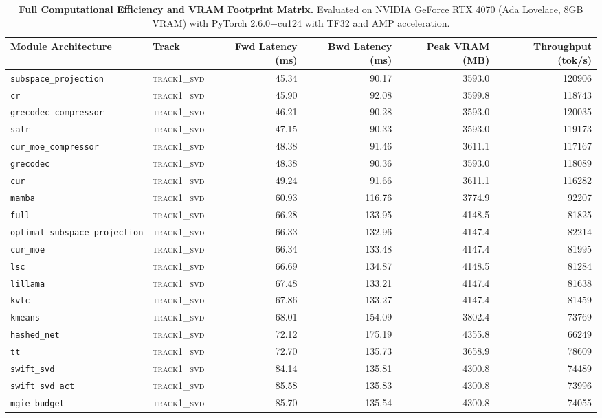\begin{table}[t]
\centering
\small
\caption{\textbf{Full Computational Efficiency and VRAM Footprint Matrix.} Evaluated on NVIDIA GeForce RTX 4070 (Ada Lovelace, 8GB VRAM) with PyTorch 2.6.0+cu124 with TF32 and AMP acceleration.}
\label{tab:efficiency_benchmark_results}
\begin{tabular}{l l r r r r}
\toprule
\textbf{Module Architecture} & \textbf{Track} & \textbf{Fwd Latency (ms)} & \textbf{Bwd Latency (ms)} & \textbf{Peak VRAM (MB)} & \textbf{Throughput (tok/s)} \\
\midrule
\texttt{subspace\_projection} & \textsc{track1\_svd} & 45.34 & 90.17 & 3593.0 & 120906 \\
\texttt{cr} & \textsc{track1\_svd} & 45.90 & 92.08 & 3599.8 & 118743 \\
\texttt{grecodec\_compressor} & \textsc{track1\_svd} & 46.21 & 90.28 & 3593.0 & 120035 \\
\texttt{salr} & \textsc{track1\_svd} & 47.15 & 90.33 & 3593.0 & 119173 \\
\texttt{cur\_moe\_compressor} & \textsc{track1\_svd} & 48.38 & 91.46 & 3611.1 & 117167 \\
\texttt{grecodec} & \textsc{track1\_svd} & 48.38 & 90.36 & 3593.0 & 118089 \\
\texttt{cur} & \textsc{track1\_svd} & 49.24 & 91.66 & 3611.1 & 116282 \\
\texttt{mamba} & \textsc{track1\_svd} & 60.93 & 116.76 & 3774.9 & 92207 \\
\texttt{full} & \textsc{track1\_svd} & 66.28 & 133.95 & 4148.5 & 81825 \\
\texttt{optimal\_subspace\_projection} & \textsc{track1\_svd} & 66.33 & 132.96 & 4147.4 & 82214 \\
\texttt{cur\_moe} & \textsc{track1\_svd} & 66.34 & 133.48 & 4147.4 & 81995 \\
\texttt{lsc} & \textsc{track1\_svd} & 66.69 & 134.87 & 4148.5 & 81284 \\
\texttt{lillama} & \textsc{track1\_svd} & 67.48 & 133.21 & 4147.4 & 81638 \\
\texttt{kvtc} & \textsc{track1\_svd} & 67.86 & 133.27 & 4147.4 & 81459 \\
\texttt{kmeans} & \textsc{track1\_svd} & 68.01 & 154.09 & 3802.4 & 73769 \\
\texttt{hashed\_net} & \textsc{track1\_svd} & 72.12 & 175.19 & 4355.8 & 66249 \\
\texttt{tt} & \textsc{track1\_svd} & 72.70 & 135.73 & 3658.9 & 78609 \\
\texttt{swift\_svd} & \textsc{track1\_svd} & 84.14 & 135.81 & 4300.8 & 74489 \\
\texttt{swift\_svd\_act} & \textsc{track1\_svd} & 85.58 & 135.83 & 4300.8 & 73996 \\
\texttt{mgie\_budget} & \textsc{track1\_svd} & 85.70 & 135.54 & 4300.8 & 74055 \\
\bottomrule
\end{tabular}
\end{table}